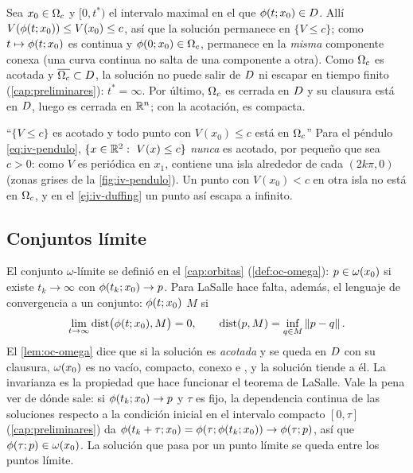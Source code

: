 \begin{demostracion}
Sea $x_0\in\Omega_{c}$ y $[0,t^*)$ el intervalo maximal en el que $\phi(t;x_0)\in D$. Allí $V(\phi(t;x_0))\le V(x_0)\le c$, así que la solución permanece en $\{V\le c\}$; como $t\mapsto\phi(t;x_0)$ es continua y $\phi(0;x_0)\in\Omega_{c}$, permanece en la \emph{misma} componente conexa (una curva continua no salta de una componente a otra). Como $\Omega_{c}$ es acotada y $\overline{\Omega_{c}}\subset D$, la solución no puede salir de $D$ ni escapar en tiempo finito (\cref{cap:preliminares}): $t^*=\infty$. Por último, $\Omega_{c}$ es cerrada en $D$ y su clausura está en $D$, luego es cerrada en $\mathbb{R}^n$; con la acotación, es compacta.
\end{demostracion}

\begin{trampa}[label=tr:iv-subnivel]{``$\{V\le c\}$ es acotado y todo punto con $V(x_0)\le c$ está en $\Omega_{c}$''}
Para el péndulo \eqref{eq:iv-pendulo}, $\{x\in\mathbb{R}^2:\ V(x)\le c\}$ \emph{nunca} es acotado, por pequeño que sea $c>0$: como $V$ es periódica en $x_1$, contiene una isla alrededor de cada $(2k\pi,0)$ (zonas grises de la \cref{fig:iv-pendulo}). Un punto con $V(x_0)<c$ en otra isla no está en $\Omega_{c}$, y en el \cref{ej:iv-duffing} un punto así escapa a infinito.
\end{trampa}

\subsection{Conjuntos límite}

El conjunto $\omega$-límite se definió en el \cref{cap:orbitas} (\cref{def:oc-omega}): $p\in\omega(x_0)$ si existe $t_k\to\infty$ con $\phi(t_k;x_0)\to p$. Para LaSalle hace falta, además, el lenguaje de convergencia a un conjunto: $\phi(t;x_0)$  $M$ si
\[
  \lim_{t\to\infty}\operatorname{dist}\bigl(\phi(t;x_0),M\bigr)=0,\qquad \operatorname{dist}(p,M)=\inf_{q\in M}\left\lVert p-q\right\rVert .
\]
El \cref{lem:oc-omega} dice que si la solución es \emph{acotada} y se queda en $D$ con su clausura, $\omega(x_0)$ es no vacío, compacto, conexo e , y la solución tiende a él. La invarianza es la propiedad que hace funcionar el teorema de LaSalle. Vale la pena ver de dónde sale: si $\phi(t_k;x_0)\to p$ y $\tau$ es fijo, la dependencia continua de las soluciones respecto a la condición inicial en el intervalo compacto $[0,\tau]$ (\cref{cap:preliminares}) da $\phi(t_k+\tau;x_0)=\phi(\tau;\phi(t_k;x_0))\to\phi(\tau;p)$, así que $\phi(\tau;p)\in\omega(x_0)$. La solución que pasa por un punto límite se queda entre los puntos límite.

